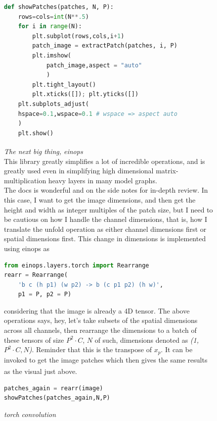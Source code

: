 \documentclass[12pt]{article}
\newcommand{\customtext}[3]{%
    \vspace{#2} %
    \fontsize{13}{8}\textcolor{#1}{\textit{#3}}%
}
\newcommand{\sidecite}[1]{\textsuperscript{\textcolor{blue}{\textbf{\scriptsize#1}}}}
\newcommand{\customtitle}[1]{\fontsize{14}{8}\textcolor{xtitle}{\textit{#1}}\\}
\newcommand{\maincitecount}{\sidecite{\stepcounter{maincite}\themaincite}}
\begin{document}
\begin{figure}[!htb]
\begin{minipage}[t]{.4\textwidth}
\begin{lstlisting}[language=python,style=python,basicstyle=\ttfamily\tiny]
def showPatches(patches, N, P):
    rows=cols=int(N**.5)
    for i in range(N):
        plt.subplot(rows,cols,i+1)
        patch_image = extractPatch(patches, i, P)
        plt.imshow(
            patch_image,aspect = "auto"
            )
        plt.tight_layout()
        plt.xticks([]); plt.yticks([])
    plt.subplots_adjust(
    hspace=0.1,wspace=0.1 # wspace => aspect auto
    )
    plt.show()
\end{lstlisting}
\end{minipage}
\end{figure}
\pagebreak
\begin{figure}[!htb]
\begin{minipage}[t]{0.65\textwidth}
\raggedright
\customtext{xtitle}{0em}{The next big thing, einops\maincitecount}\\
This library greatly simplifies a lot of incredible operations, and is 
greatly used even in simplifying high dimensional matrix-multiplication 
heavy layers in many model graphs.\\
The docs is wonderful and on the side notes for in-depth review. 
In this case, I want to get the image dimensions, and then get the 
height and width as integer multiples of the patch size, but I need to 
be cautious on how I handle the channel dimensions, that is, how I translate 
the unfold operation as either channel dimensions first or spatial dimensions
first.
    This change in dimensions is implemented using einops as     
\begin{lstlisting}[language=python,style=python,basicstyle=\ttfamily\footnotesize]
from einops.layers.torch import Rearrange
rearr = Rearrange(
    'b c (h p1) (w p2) -> b (c p1 p2) (h w)', 
    p1 = P, p2 = P)
\end{lstlisting}
considering that the image is already a {4D} tensor. The above operations says,
hey, let's take subsets of the spatial dimensions across all channels, then 
rearrange the dimensions to a batch of these tensors of size {\small$P^2\cdot C$},
$N$ of such, dimensions denoted as {\it (1,$P^2\cdot C,N$)}. 
Reminder that this is the transpose of $x_p$. It can be invoked to get the image 
patches which then gives the same results as the visual just above.\maincitecount
\begin{lstlisting}[language=python,style=python,basicstyle=\ttfamily\footnotesize]
patches_again = rearr(image)
showPatches(patches_again,N,P)
\end{lstlisting}
\customtitle{torch convolution}

\end{minipage}
\end{figure}
\end{document}
